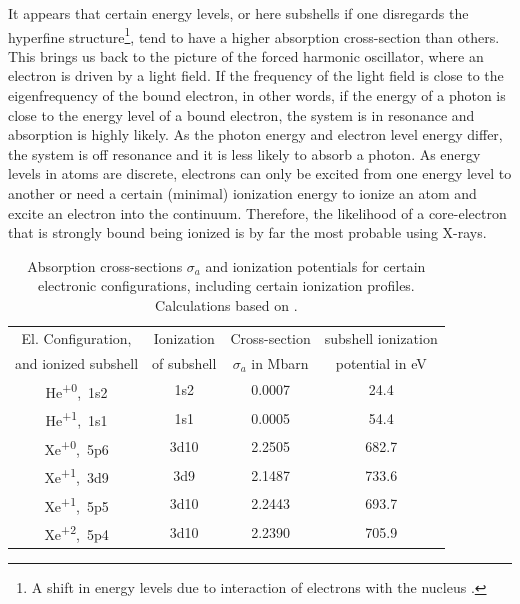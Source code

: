 It appears that certain energy levels, or here subshells if one disregards the hyperfine structure\footnote{A shift in energy levels due to interaction of electrons with the nucleus \citep[see][p~166~ff.]{Demtroder-2005-Springer}.}, tend to have a higher absorption cross-section than others. This brings us back to the picture of the forced harmonic oscillator, where an electron is driven by a light field. If the frequency of the light field is close to the eigenfrequency of the bound electron, in other words, if the energy of a photon is close to the energy level of a bound electron, the system is in resonance and absorption is highly likely. As the photon energy and electron level energy differ, the system is off resonance and it is less likely to absorb a photon. As energy levels in atoms are discrete, electrons can only be excited from one energy level to another or need a certain (minimal) ionization energy to ionize an atom and excite an electron into the continuum. Therefore, the likelihood of a core-electron that is strongly bound being ionized is by far the most probable using X-rays.
\begin{table}
	\centering
		\begin{tabular}{ | c | c | c | c | }
		\hline
			El. Configuration, & Ionization & Cross-section  & subshell ionization  \\
			and ionized subshell & of subshell & $\sigma_{a}$ in Mbarn & potential in eV \\ \hline
			He\textsuperscript{+0},\ 1s2 & 1s2 & 0.0007 & 24.4 \\ \hline
			He\textsuperscript{+1},\ 1s1 & 1s1 & 0.0005 & 54.4 \\ \hline
			Xe\textsuperscript{+0},\ 5p6 & 3d10 & 2.2505 & 682.7 \\ \hline
			Xe\textsuperscript{+1},\ 3d9 & 3d9 & 2.1487 & 733.6 \\ \hline
			Xe\textsuperscript{+1},\ 5p5 & 3d10 & 2.2443 & 693.7 \\ \hline
			Xe\textsuperscript{+2},\ 5p4 & 3d10 & 2.2390 & 705.9 \\ \hline
		\end{tabular}
	\caption[Absorption cross-sections and ionization potentials for xenon and helium]{Absorption cross-sections $\sigma_{a}$ and ionization potentials for certain electronic configurations, including certain ionization profiles. Calculations based on \citep{Cowan-1981-Cal}.}
	\label{tab:helium-xenon-ionization}
\end{table}
